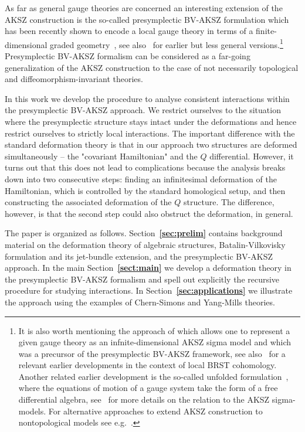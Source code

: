 \documentclass[a4paper,12pt]{article}
\numberwithin{equation}{section} %
\newcommand{\bref}[1]{\textbf{\ref{#1}}}
\begin{document}
As far as general gauge theories are concerned an interesting extension of the AKSZ construction is the so-called presymplectic BV-AKSZ formulation which has been recently shown to encode a local gauge theory in terms of a finite-dimensional graded geometry~\cite{Grigoriev:2022zlq,Dneprov:2024cvt}, see also~\cite{Alkalaev:2013hta,Grigoriev:2016wmk,Grigoriev:2020xec,Dneprov:2022jyn} for earlier but less general versions.\footnote{It is also worth mentioning the approach of \cite{Barnich:2010sw,Grigoriev:2010ic,Grigoriev:2019ojp} 
which allows one to represent a given gauge theory as an infnite-dimensional AKSZ sigma model and which was a precursor of the presymplectic BV-AKSZ framework, see also~\cite{Stora:1984,Barnich:1995ap,Brandt:1996mh} for a relevant earlier developments in the context of local BRST cohomology. Another related earlier development is the so-called unfolded formulation~\cite{Vasiliev:1988xc,Vasiliev:2005zu}, where the equations of motion of a gauge system take the form of a free differential algebra, see~\cite{Barnich:2006hbb} for more details on the relation to the AKSZ sigma-models. For alternative approaches to extend AKSZ construction to nontopological models see e.g.~\cite{costello2011renormalization,Bonechi:2022aji}.} Presymplectic BV-AKSZ formalism can be considered as a far-going generalization of the AKSZ construction to the case of not necessarily topological and diffeomorphism-invariant theories. 

In this work we develop the procedure to analyse consistent interactions within the presymplectic BV-AKSZ approach. We restrict ourselves to the situation where the presymplectic structure stays intact under the deformations and hence restrict ourselves to strictly local interactions.  The important difference with the standard deformation theory is that in our approach two structures are deformed simultaneously -- the "covariant Hamiltonian"  and the $Q$ differential. However, it turns out that this does not lead to complications because the analysis breaks down into two consecutive steps: finding an infinitesimal deformation of the Hamiltonian, which is controlled by the standard homological setup, and then constructing the associated deformation of the $Q$ structure. The difference, however, is that the second step could also obstruct the deformation, in general.  

The paper is organized as follows. Section~\bref{sec:prelim} contains background material on the deformation theory of algebraic structures, Batalin-Vilkovisky formulation and its jet-bundle extension, and the presymplectic BV-AKSZ approach. In the main Section~\bref{sect:main} we develop a deformation theory in the presymplectic BV-AKSZ formalism and spell out explicitly the recursive procedure for studying interactions. In Section~\bref{sec:applications} we illustrate the approach using the examples of Chern-Simons and Yang-Mills theories.
\end{document}
